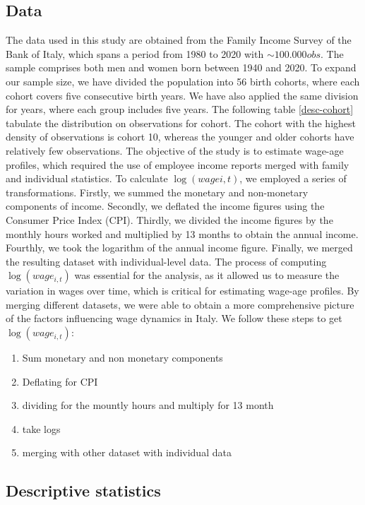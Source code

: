 \documentclass[12pt]{article}
\begin{document}
\subsection{Data}
The data used in this study are obtained from the Family Income Survey of the Bank of Italy, which spans a period from
1980 to 2020 with $\sim100.000 obs$. The sample comprises both men and women born between 1940 and 2020. To expand our
sample size, we have divided the population into 56 birth cohorts, where each cohort covers five consecutive birth
years. We have also applied the same division for years, where each group includes five years. The following table
\ref{desc-cohort} tabulate the distribution on observations for cohort. The cohort with the highest density of
observations is cohort 10, whereas the younger and older cohorts have relatively few observations. The objective of the
study is to estimate wage-age profiles, which required the use of employee income reports merged with family and
individual statistics. To calculate $\log(wagei,t)$, we employed a series of transformations. Firstly, we summed the
monetary and non-monetary components of income. Secondly, we deflated the income figures using the Consumer Price Index
(CPI). Thirdly, we divided the income figures by the monthly hours worked and multiplied by 13 months to obtain the
annual income. Fourthly, we took the logarithm of the annual income figure. Finally, we merged the resulting dataset
with individual-level data.
\newline
The process of computing \(\log(wage_{i,t})\) was essential for the analysis, as it allowed us to measure the variation
in wages over time, which is critical for estimating wage-age profiles. By merging different datasets, we were able to
obtain a more comprehensive picture of the factors influencing wage dynamics in Italy. We follow these steps to get
\(\log(wage_{i,t})\):
\begin{enumerate}
    \item Sum monetary and non monetary components 
    \item Deflating for CPI
    \item dividing for the mountly hours and multiply for 13 month
    \item take logs
    \item merging with other dataset with individual data
\end{enumerate}
\subsection{Descriptive statistics}
\end{document}
